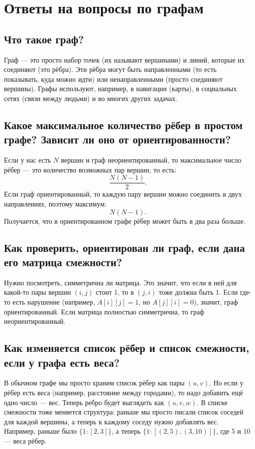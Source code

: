 \documentclass{article}
\begin{document}
\section*{Ответы на вопросы по графам}

\subsection*{Что такое граф?}
Граф — это просто набор точек (их называют вершинами) и линий, которые их соединяют (это рёбра). Эти рёбра могут быть направленными (то есть показывать, куда можно идти) или ненаправленными (просто соединяют вершины). Графы используют, например, в навигации (карты), в социальных сетях (связи между людьми) и во многих других задачах.

\subsection*{Какое максимальное количество рёбер в простом графе? Зависит ли оно от ориентированности?}
Если у нас есть $N$ вершин и граф неориентированный, то максимальное число рёбер — это количество возможных пар вершин, то есть:
\[
\frac{N(N-1)}{2}.
\]
Если граф ориентированный, то каждую пару вершин можно соединить в двух направлениях, поэтому максимум:
\[
N(N-1).
\]
Получается, что в ориентированном графе рёбер может быть в два раза больше.

\subsection*{Как проверить, ориентирован ли граф, если дана его матрица смежности?}
Нужно посмотреть, симметрична ли матрица. Это значит, что если в ней для какой-то пары вершин $(i, j)$ стоит 1, то в $(j, i)$ тоже должна быть 1. Если где-то есть нарушение (например, $A[i][j]=1$, но $A[j][i]=0$), значит, граф ориентированный. Если матрица полностью симметрична, то граф неориентированный.

\subsection*{Как изменяется список рёбер и список смежности, если у графа есть веса?}
В обычном графе мы просто храним список рёбер как пары $(u, v)$. Но если у рёбер есть веса (например, расстояние между городами), то надо добавить ещё одно число — вес. Теперь ребро будет выглядеть как $(u, v, w)$.
В списке смежности тоже меняется структура: раньше мы просто писали список соседей для каждой вершины, а теперь к каждому соседу нужно добавлять вес. Например, раньше было $\{1: [2, 3]\}$, а теперь $\{1: [(2, 5), (3, 10)]\}$, где 5 и 10 — веса рёбер.
\end{document}
